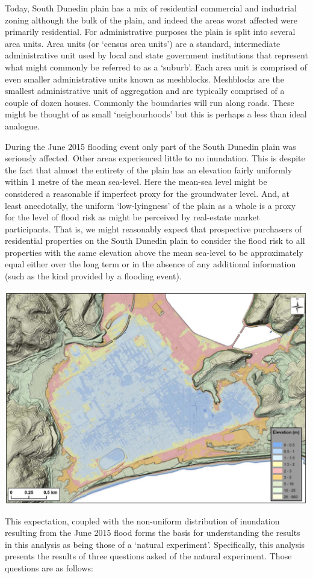 \documentclass[]{article}
\begin{document}
Today, South Dunedin plain has a mix of residential commercial and
industrial zoning although the bulk of the plain, and indeed the areas
worst affected were primarily residential. For administrative purposes
the plain is split into several area units. Area units (or `census area
units') are a standard, intermediate administrative unit used by local
and state government institutions that represent what might commonly be
referred to as a `suburb'. Each area unit is comprised of even smaller
administrative units known as meshblocks. Meshblocks are the smallest
administrative unit of aggregation and are typically comprised of a
couple of dozen houses. Commonly the boundaries will run along roads.
These might be thought of as small `neigbourhoods' but this is perhaps a
less than ideal analogue.

During the June 2015 flooding event only part of the South Dunedin plain
was seriously affected. Other areas experienced little to no inundation.
This is despite the fact that almost the entirety of the plain has an
elevation fairly uniformly within 1 metre of the mean sea-level. Here
the mean-sea level might be considered a reasonable if imperfect proxy
for the groundwater level. And, at least anecdotally, the uniform
`low-lyingness' of the plain as a whole is a proxy for the level of
flood risk as might be perceived by real-estate market participants.
That is, we might reasonably expect that prospective purchasers of
residential properties on the South Dunedin plain to consider the flood
risk to all properties with the same elevation above the mean sea-level
to be approximately equal either over the long term or in the absence of
any additional information (such as the kind provided by a flooding
event).

\begin{center}\includegraphics[width=0.5\linewidth]{../images/sd_elevation_1} \end{center}

This expectation, coupled with the non-uniform distribution of
inundation resulting from the June 2015 flood forms the basis for
understanding the results in this analysis as being those of a `natural
experiment'. Specifically, this analysis presents the results of three
questions asked of the natural experiment. Those questions are as
follows:
\end{document}
